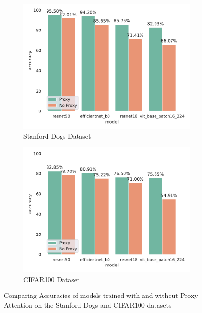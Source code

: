 \begin{figure}[!htb]
    \begin{subfigure}[h]{.5\textwidth}
        \includegraphics[width=\linewidth, right]{results/dogs_results.pdf}
        \caption{Stanford Dogs Dataset}
    \end{subfigure}
    \begin{subfigure}[h]{.5\textwidth}
        \includegraphics[width=\linewidth, left]{results/cifar100_results.pdf}
        \caption{CIFAR100 Dataset}
    \end{subfigure}
    \caption{Comparing Accuracies of models trained with and without Proxy Attention on the Stanford Dogs and CIFAR100 datasets}
    \label{fig:dogs_cifar100_results}
\end{figure}

